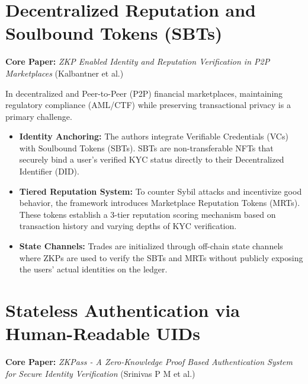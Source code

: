\documentclass[12pt, a4paper]{article}
\begin{document}
\section{Decentralized Reputation and Soulbound Tokens (SBTs)}
\textbf{Core Paper:} \textit{ZKP Enabled Identity and Reputation Verification in P2P Marketplaces} (Kalbantner et al.)

In decentralized and Peer-to-Peer (P2P) financial marketplaces, maintaining regulatory compliance (AML/CTF) while preserving transactional privacy is a primary challenge.
\begin{itemize}
    \item \textbf{Identity Anchoring:} The authors integrate Verifiable Credentials (VCs) with Soulbound Tokens (SBTs). SBTs are non-transferable NFTs that securely bind a user's verified KYC status directly to their Decentralized Identifier (DID).
    \item \textbf{Tiered Reputation System:} To counter Sybil attacks and incentivize good behavior, the framework introduces Marketplace Reputation Tokens (MRTs). These tokens establish a 3-tier reputation scoring mechanism based on transaction history and varying depths of KYC verification.
    \item \textbf{State Channels:} Trades are initialized through off-chain state channels where ZKPs are used to verify the SBTs and MRTs without publicly exposing the users' actual identities on the ledger.
\end{itemize}

\section{Stateless Authentication via Human-Readable UIDs}
\textbf{Core Paper:} \textit{ZKPass - A Zero-Knowledge Proof Based Authentication System for Secure Identity Verification} (Srinivas P M et al.)
\end{document}

